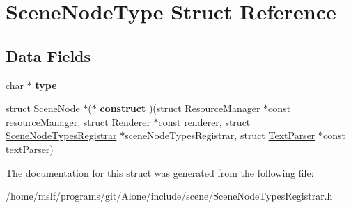 \hypertarget{struct_scene_node_type}{}\section{Scene\+Node\+Type Struct Reference}
\label{struct_scene_node_type}
\subsection*{Data Fields}
\begin{DoxyCompactItemize}
\item 
\hypertarget{struct_scene_node_type_a23506fc4821ab6d9671f3e6222591a96}{}\label{struct_scene_node_type_a23506fc4821ab6d9671f3e6222591a96} 
char $\ast$ {\bfseries type}
\item 
\hypertarget{struct_scene_node_type_a73c6b5f5faad9469791b4d28ad90495b}{}\label{struct_scene_node_type_a73c6b5f5faad9469791b4d28ad90495b} 
struct \hyperlink{struct_scene_node}{Scene\+Node} $\ast$($\ast$ {\bfseries construct} )(struct \hyperlink{struct_resource_manager}{Resource\+Manager} $\ast$const resource\+Manager, struct \hyperlink{struct_renderer}{Renderer} $\ast$const renderer, struct \hyperlink{struct_scene_node_types_registrar}{Scene\+Node\+Types\+Registrar} $\ast$scene\+Node\+Types\+Registrar, struct \hyperlink{struct_text_parser}{Text\+Parser} $\ast$const text\+Parser)
\end{DoxyCompactItemize}


The documentation for this struct was generated from the following file\+:\begin{DoxyCompactItemize}
\item 
/home/mslf/programs/git/\+Alone/include/scene/Scene\+Node\+Types\+Registrar.\+h\end{DoxyCompactItemize}
